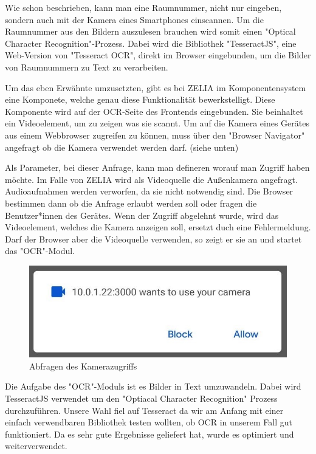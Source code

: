 

Wie schon beschrieben, kann man eine Raumnummer, nicht nur eingeben, sondern auch mit der Kamera eines Smartphones einscannen. Um die Raumnummer aus den Bildern auszulesen brauchen wird somit einen "Optical Character Recognition"-Prozess. Dabei wird die Bibliothek "TesseractJS", eine Web-Version von "Tesseract OCR", direkt im Browser eingebunden, um die Bilder von Raumnummern zu Text zu verarbeiten.

Um das eben Erwähnte umzusetzten, gibt es bei ZELIA im Komponentensystem eine Komponete, welche genau diese Funktionalität bewerkstelligt. Diese Komponente wird auf der OCR-Seite des Frontends eingebunden. Sie beinhaltet ein Videoelement, um zu zeigen was sie scannt. Um auf die Kamera eines Gerätes aus einem Webbrowser zugreifen zu können, muss über den "Browser Navigator" angefragt ob die Kamera verwendet werden darf. (siehe unten)


Als Parameter, bei dieser Anfrage, kann man defineren worauf man Zugriff haben möchte. Im Falle von ZELIA wird als Videoquelle die Außenkamera angefragt. Audioaufnahmen werden verworfen, da sie nicht notwendig sind. Die Browser bestimmen dann ob die Anfrage erlaubt werden soll oder fragen die Benutzer*innen des Gerätes. Wenn der Zugriff abgelehnt wurde, wird das Videoelement, welches die Kamera anzeigen soll, ersetzt duch eine Fehlermeldung. Darf der Browser aber die Videoquelle verwenden, so zeigt er sie an und startet das "OCR"-Modul.

\begin{figure}[H]
    \centering
    \includegraphics[width=120mm]{media/OCR/cam_access_light.jpg}
    \caption{Abfragen des Kamerazugriffs}
\end{figure}


Die Aufgabe des "OCR"-Moduls ist es Bilder in Text umzuwandeln. Dabei wird TesseractJS verwendet um den "Optiacal Character Recognition" Prozess durchzuführen. Unsere Wahl fiel auf Tesseract da wir am Anfang mit einer einfach verwendbaren Bibliothek testen wollten, ob OCR in unserem Fall gut funktioniert. Da es sehr gute Ergebnisse geliefert hat, wurde es optimiert und weiterverwendet.

